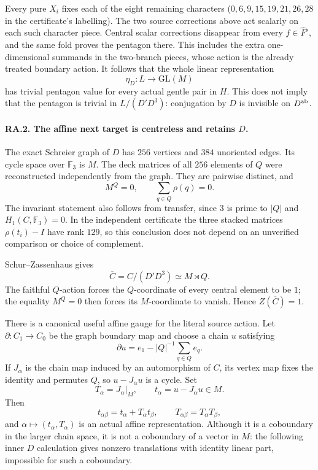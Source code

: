 Every pure $X_i$ fixes each of the eight remaining characters
($0,6,9,15,19,21,26,28$ in the certificate's labelling).
The two source corrections above act scalarly on each such
character piece.  Central scalar corrections disappear from every
$f\in\widehat F'$, and the same fold proves the pentagon there.
This includes the extra one-dimensional summands in the two-branch
pieces, whose action is the already treated boundary action.
It follows that the whole linear representation
\[
 \eta_D:L\longrightarrow\mathrm{GL}(M)
\]
has trivial pentagon value for every actual gentle pair in $H$.
This does not imply that the pentagon is trivial in
$L/(D'D^3)$: conjugation by $D$ is invisible on $D^{\rm ab}$.

\paragraph{RA.2. The affine next target is centreless and retains $D$.}
The exact Schreier graph of $D$ has $256$ vertices and $384$
unoriented edges.  Its cycle space over $\mathbb F_3$ is $M$.
The deck matrices of all $256$ elements of $Q$ were reconstructed
independently from the graph.  They are pairwise distinct, and
\[
 M^Q=0,\qquad \sum_{q\in Q}\rho(q)=0.
\]
The invariant statement also follows from transfer, since $3$ is
prime to $|Q|$ and $H_1(C,\mathbb F_3)=0$.  In the independent
certificate the three stacked matrices $\rho(t_i)-I$ have rank
$129$, so this conclusion does not depend on an unverified
comparison or choice of complement.

Schur--Zassenhaus gives
\[
 \overline C=C/(D'D^3)\simeq M\rtimes Q.
\]
The faithful $Q$-action forces the $Q$-coordinate of every central
element to be $1$; the equality $M^Q=0$ then forces its
$M$-coordinate to vanish.  Hence $Z(\overline C)=1$.

There is a canonical useful affine gauge for the literal source
action.  Let $\partial:C_1\to C_0$ be the graph boundary map and
choose a chain $u$ satisfying
\[
 \partial u=e_1-|Q|^{-1}\sum_{q\in Q}e_q.
\]
If $J_\alpha$ is the chain map induced by an automorphism of $C$,
its vertex map fixes the identity and permutes $Q$, so
$u-J_\alpha u$ is a cycle.  Set
\[
 T_\alpha=J_\alpha|_M,\qquad
 t_\alpha=u-J_\alpha u\in M.
\]
Then
\[
 t_{\alpha\beta}=t_\alpha+T_\alpha t_\beta,
 \qquad T_{\alpha\beta}=T_\alpha T_\beta,
\]
and $\alpha\mapsto(t_\alpha,T_\alpha)$ is an actual affine
representation.  Although it is a coboundary in the larger chain space, it is
not a coboundary of a vector in $M$: the following inner
$D$ calculation gives nonzero translations with identity
linear part, impossible for such a coboundary.

